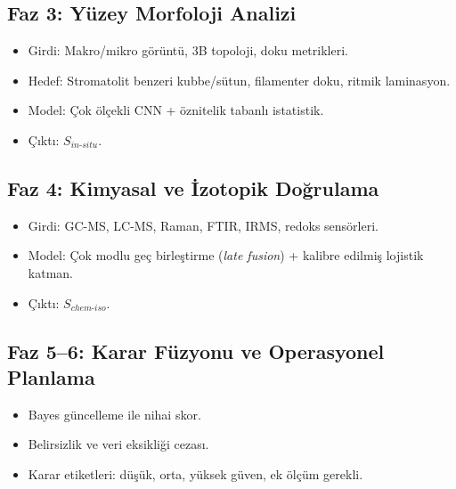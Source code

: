 \documentclass[12pt,a4paper]{article}
\begin{document}
\subsection{Faz 3: Yüzey Morfoloji Analizi}
\begin{itemize}
    \item Girdi: Makro/mikro görüntü, 3B topoloji, doku metrikleri.
    \item Hedef: Stromatolit benzeri kubbe/sütun, filamenter doku, ritmik laminasyon.
    \item Model: Çok ölçekli CNN + öznitelik tabanlı istatistik.
    \item Çıktı: $S_{in\text{-}situ}$.
\end{itemize}

\subsection{Faz 4: Kimyasal ve İzotopik Doğrulama}
\begin{itemize}
    \item Girdi: GC-MS, LC-MS, Raman, FTIR, IRMS, redoks sensörleri.
    \item Model: Çok modlu geç birleştirme (\textit{late fusion}) + kalibre edilmiş lojistik katman.
    \item Çıktı: $S_{chem\text{-}iso}$.
\end{itemize}

\subsection{Faz 5--6: Karar Füzyonu ve Operasyonel Planlama}
\begin{itemize}
    \item Bayes güncelleme ile nihai skor.
    \item Belirsizlik ve veri eksikliği cezası.
    \item Karar etiketleri: düşük, orta, yüksek güven, ek ölçüm gerekli.
\end{itemize}
\end{document}
